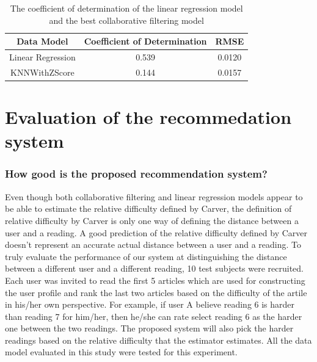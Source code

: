 \begin{table}[btp]
 \caption{\label{table:r2_linear_vs_cf} The coefficient of determination of the linear regression model and the best collaborative filtering model}
 \begin{center}
  \begin{tabular}{ccc}
   \hline
   Data Model & Coefficient of Determination & RMSE \\
   \hline
   Linear Regression & 0.539 & 0.0120 \\
   KNNWithZScore & 0.144 & 0.0157 \\
   \hline
  \end{tabular} 
 \end{center}
\end{table}

\section{Evaluation of the recommedation system}

\subsubsection{How good is the proposed recommendation system?}
\vspace{10pt}
Even though both collaborative filtering and linear regression models appear to be able to estimate the relative difficulty defined by Carver, the definition of relative difficulty by Carver is only one way of defining the distance between a user and a reading. A good prediction of the relative difficulty defined by Carver doesn't represent an accurate actual distance between a user and a reading. To truly evaluate the performance of our system at distinguishing the distance between a different user and a different reading, 10 test subjects were recruited. Each user was invited to read the first 5 articles which are used for constructing the user profile and rank the last two articles based on the difficulty of the artile in his/her own perspective. For example, if user A believe reading 6 is harder than reading 7 for him/her, then he/she can rate select reading 6 as the harder one between the two readings. The proposed system will also pick the harder readings based on the relative difficulty that the estimator estimates. All the data model evaluated in this study were tested for this experiment.

